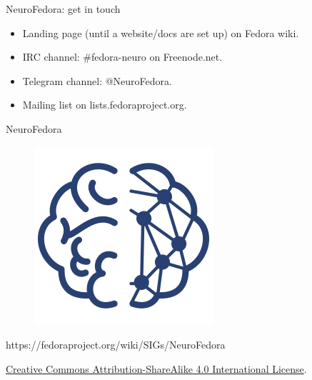 \begin{frame}[c]{NeuroFedora: get in touch}
  \begin{itemize}
    \item Landing page (until a website/docs are set up) on Fedora wiki\footnotemark.
    \item IRC channel: \#fedora-neuro on Freenode.net\footnotemark.
    \item Telegram channel: @NeuroFedora\footnotemark.
    \item Mailing list on lists.fedoraproject.org\footnotemark.
  \end{itemize}
\end{frame}
\begin{frame}[c]{NeuroFedora}
  \begin{figure}[h]
    \centering
    \includegraphics[keepaspectratio,height=0.5\textheight]{images/NeuroFedoraLogo01.png}
  \end{figure}
  \begin{center}
    https://fedoraproject.org/wiki/SIGs/NeuroFedora\vspace{0.2cm}

    \href{http://creativecommons.org/licenses/by-sa/4.0/}{Creative Commons Attribution-ShareAlike 4.0 International License}.\vspace{0.2cm}

    \ccbysa{}
  \end{center}
\end{frame}


